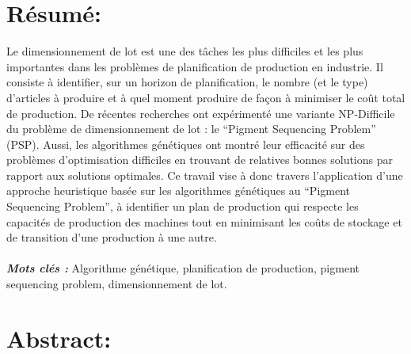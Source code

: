 \documentclass[12pt,a4paper]{article}
\begin{document}
	\newpage
	\tableofcontents
	
	\newpage
	
	\listoffigures
	
	\newpage
	
	\listoftables
	
	\newpage %
	
	\section*{Résumé:}
	
	\vspace{1cm}
	
	Le dimensionnement de lot est une des tâches les plus difficiles et les plus importantes dans les problèmes de planification de production en industrie. Il consiste à identifier, sur un horizon de planification, le nombre (et le type) d’articles à produire et à quel moment produire de façon à minimiser le coût total de production. De récentes recherches ont expérimenté une variante NP-Difficile du problème de dimensionnement de lot : le “Pigment Sequencing Problem” (PSP). Aussi, les algorithmes génétiques ont montré leur efficacité sur des problèmes d’optimisation difficiles en trouvant de relatives bonnes solutions par rapport aux solutions optimales. Ce travail vise à donc travers l'application d'une approche heuristique basée sur les algorithmes génétiques au “Pigment Sequencing Problem”, à identifier un plan de production qui respecte les capacités de production des machines tout en minimisant les coûts de stockage et de transition d’une production à une autre. \\
	\\
	\hspace*{.5cm}\textsl{\textbf{Mots clés :}} Algorithme génétique, planification de production, pigment sequencing problem, dimensionnement de lot.
	
	\newpage %
	
	\section*{Abstract:}
	
	\vspace{1cm}
	
\end{document}

